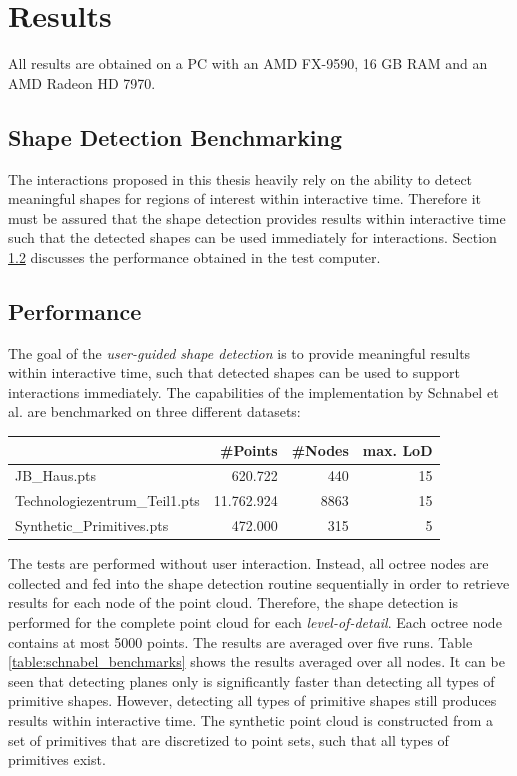 \chapter{Results}
\label{chap:results}


All results are obtained on a PC with an AMD FX-9590, 16 GB RAM and an AMD Radeon HD 7970. 


\section{Shape Detection Benchmarking}

The interactions proposed in this thesis heavily rely on the ability to detect meaningful shapes for regions of interest within interactive time. Therefore it must be assured that the shape detection provides results within interactive time such that the detected shapes can be used immediately for interactions. Section \ref{sec:shapedetectionperformance} discusses the performance obtained in the test computer. 


\section{Performance}
\label{sec:shapedetectionperformance}

The goal of the \textit{user-guided shape detection} is to provide meaningful results within interactive time, such that detected shapes can be used to support interactions immediately. The capabilities of the implementation by Schnabel et al.\cite{schnabel-2007-software} are benchmarked on three different datasets: 

\begin{center}
\begin{tabular}{ l | r | r | r }
																& \textbf{\#Points} 			& \textbf{\#Nodes} & \textbf{max. LoD} \\
	\hline
  JB\_Haus.pts									& 620.722 								& 440 			& 15 \\
  Technologiezentrum\_Teil1.pts	& 11.762.924							& 8863 			& 15 \\
  Synthetic\_Primitives.pts 		& 472.000 								& 315	 			& 5 \\
	
\end{tabular}
\end{center}

The tests are performed without user interaction. Instead, all octree nodes are collected and fed into the shape detection routine sequentially in order to retrieve results for each node of the point cloud. Therefore, the shape detection is performed for the complete point cloud for each \textit{level-of-detail}. Each octree node contains at most 5000 points. The results are averaged over five runs. Table \ref{table:schnabel_benchmarks} shows the results averaged over all nodes. It can be seen that detecting planes only is significantly faster than detecting all types of primitive shapes. However, detecting all types of primitive shapes still produces results within interactive time. The synthetic point cloud is constructed from a set of primitives that are discretized to point sets, such that all types of primitives exist. 

